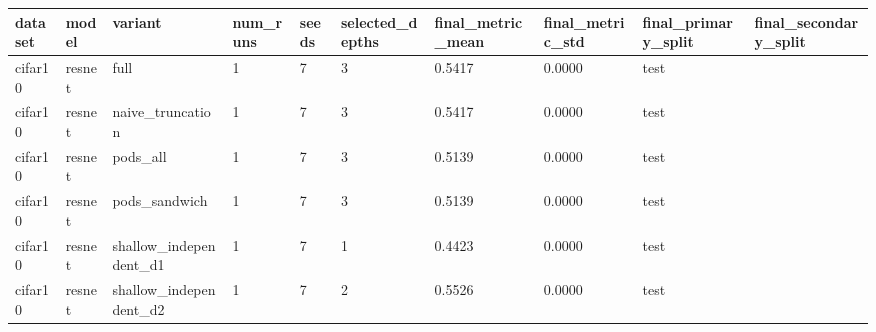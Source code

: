 \begin{tabular}{llllllllll}
\hline
dataset & model & variant & num\_runs & seeds & selected\_depths & final\_metric\_mean & final\_metric\_std & final\_primary\_split & final\_secondary\_split \\
\hline
cifar10 & resnet & full & 1 & 7 & 3 & 0.5417 & 0.0000 & test &  \\
cifar10 & resnet & naive\_truncation & 1 & 7 & 3 & 0.5417 & 0.0000 & test &  \\
cifar10 & resnet & pods\_all & 1 & 7 & 3 & 0.5139 & 0.0000 & test &  \\
cifar10 & resnet & pods\_sandwich & 1 & 7 & 3 & 0.5139 & 0.0000 & test &  \\
cifar10 & resnet & shallow\_independent\_d1 & 1 & 7 & 1 & 0.4423 & 0.0000 & test &  \\
cifar10 & resnet & shallow\_independent\_d2 & 1 & 7 & 2 & 0.5526 & 0.0000 & test &  \\
\hline
\end{tabular}
